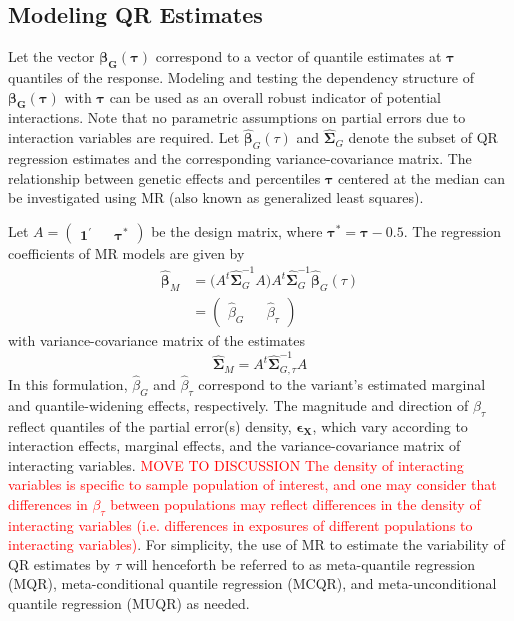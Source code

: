 \documentclass[12pt]{article}
\begin{document}
\begin{appendices}
\subsection{Modeling QR Estimates}
\indent \indent Let the vector $\bm{\beta_G(\tau)}$ correspond to a vector of quantile estimates at $\bm{\tau}$ quantiles of the response. Modeling and testing the dependency structure of $\bm{\beta_G(\tau)}$ with $\bm{\tau}$ can be used as an overall robust indicator of potential interactions. Note that no parametric assumptions on partial errors due to interaction variables are required. Let $\bm{\widehat{\beta}}_G(\tau)$ and $\bm{\widehat{\Sigma}}_G$ denote the subset of QR regression estimates and the corresponding variance-covariance matrix. The relationship between genetic effects and percentiles $\boldsymbol{\tau}$ centered at the median can be investigated using MR (also known as generalized least squares).

Let $A= \begin{pmatrix} \bm{1}^{'} && \bm{\tau}^{*} \end{pmatrix}$ be the design matrix, where $\bm{\tau}^{*} = \bm{\tau} - 0.5$. The regression coefficients of MR models are given by
\begin{equation}
\begin{split}
\bm{\widehat{\beta}}_M &= \big(A^{t}\bm{\widehat{\Sigma}}_{G}^{-1} A \big) A^{t} \bm{\widehat{\Sigma}}_{G}^{-1}\bm{\widehat{\beta}}_{G}(\tau) \\
&=\begin{pmatrix} \widehat{\beta}_G && \widehat{\beta}_\tau \end{pmatrix}
\end{split}
\end{equation}
with variance-covariance matrix of the estimates 
\begin{equation*}
	\bm{\widehat{\Sigma}}_M=A^{t}\bm{\widehat{\Sigma}}_{G, \tau}^{-1} A
\end{equation*}
In this formulation, $\widehat{\beta}_G$ and $\widehat{\beta}_\tau$ correspond to the variant's estimated marginal and quantile-widening effects, respectively. The magnitude and direction of $\beta_\tau$ reflect quantiles of the partial error(s) density, $\bm{\epsilon_X}$, which vary according to interaction effects, marginal effects, and the variance-covariance matrix of interacting variables. \textcolor{red}{MOVE TO DISCUSSION The density of interacting variables is specific to sample population of interest, and one may consider that differences in $\beta_\tau$ between populations may reflect differences in the density of interacting variables (i.e. differences in exposures of different populations to interacting variables)}. For simplicity, the use of MR to estimate the variability of QR estimates by $\tau$ will henceforth be referred to as meta-quantile regression (MQR), meta-conditional quantile regression (MCQR), and meta-unconditional quantile regression (MUQR) as needed.


\end{appendices}
\end{document}
